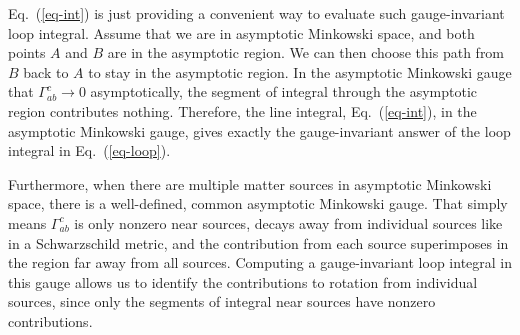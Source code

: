 \documentclass[aps,showpacs,twocolumn,floats,prd,superscriptaddress,nofootinbib]{revtex4-1}
\begin{document}
Eq.~(\ref{eq-int}) is just providing a convenient way to evaluate such gauge-invariant loop integral.
Assume that we are in asymptotic Minkowski space, and both points $A$ and $B$ are in the asymptotic region.
We can then choose this path from $B$ back to $A$ to stay in the asymptotic region.
In the asymptotic Minkowski gauge that $\Gamma_{ab}^c\rightarrow0$ asymptotically, the segment of integral through the asymptotic region contributes nothing.
Therefore, the line integral, Eq.~(\ref{eq-int}), in the asymptotic Minkowski gauge, gives exactly the gauge-invariant answer of the loop integral in Eq.~(\ref{eq-loop}).

Furthermore, when there are multiple matter sources in asymptotic Minkowski space, there is a well-defined, common asymptotic Minkowski gauge.
That simply means $\Gamma_{ab}^c$ is only nonzero near sources, decays away from individual sources like in a Schwarzschild metric, and the contribution from each source superimposes in the region far away from all sources.
Computing a gauge-invariant loop integral in this gauge allows us to identify the contributions to rotation from individual sources, since only the segments of integral near sources have nonzero contributions.
\end{document}
